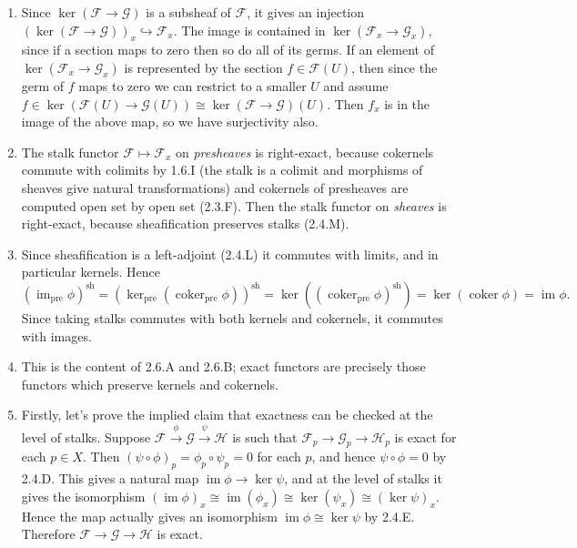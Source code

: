 \documentclass{report}
\newcommand{\pre}{{\mathrm{pre}}} %
\newcommand{\sh}{{\mathrm{sh}}} %
\newcommand{\scrF}{\mathscr{F}}
\newcommand{\scrG}{\mathscr{G}}
\newcommand{\scrH}{\mathscr{H}}
\DeclareMathOperator{\im}{im}
\DeclareMathOperator{\coker}{coker}
\begin{document}
\begin{enumerate}[label=\textbf{2.6.\Alph*.}]
	\item Since $\ker(\scrF\to\scrG)$ is a subsheaf of $\scrF$, it gives an injection
	      $(\ker(\scrF\to\scrG))_x\hookrightarrow\scrF_x$. The image is contained in
	      $\ker(\scrF_x\to\scrG_x)$, since if a section maps to zero then so do all of
	      its germs. If an element of $\ker(\scrF_x\to\scrG_x)$ is represented by the
	      section $f\in\scrF(U)$, then since the germ of $f$ maps to zero we can
	      restrict to a smaller $U$ and assume
	      $f\in\ker(\scrF(U)\to\scrG(U))\cong\ker(\scrF\to\scrG)(U)$. Then $f_x$ is in the
	      image of the above map, so we have surjectivity also.

	\item The stalk functor $\scrF\mapsto\scrF_x$ on \emph{presheaves} is right-exact,
	      because cokernels commute with colimits by 1.6.I (the stalk is a colimit
	      and morphisms of sheaves give natural transformations) and cokernels of
	      presheaves are computed open set by open set (2.3.F). Then the stalk
	      functor on \emph{sheaves} is right-exact, because sheafification
	      preserves stalks (2.4.M).

	\item Since sheafification is a left-adjoint (2.4.L) it commutes with
	      limits, and in particular kernels. Hence
	      \begin{equation*}
		      (\im_\pre\phi)^\sh
		      = (\ker_\pre(\coker_\pre\phi))^\sh
		      = \ker((\coker_\pre\phi)^\sh)
		      = \ker(\coker\phi)
		      = \im\phi.
	      \end{equation*}
	      Since taking stalks commutes with both kernels and cokernels, it commutes
	      with images.

	\item This is the content of 2.6.A and 2.6.B; exact functors are precisely
	      those functors which preserve kernels and cokernels.

	\item Firstly, let's prove the implied claim that exactness can be checked
	      at the level of stalks. Suppose $\scrF\xrightarrow\phi\scrG\xrightarrow\psi\scrH$
	      is such that $\scrF_p\to\scrG_p\to\scrH_p$ is exact for each $p\in X$. Then
	      $(\psi\circ\phi)_p=\phi_p\circ\psi_p=0$ for each $p$, and hence
	      $\psi\circ\phi=0$ by 2.4.D. This gives a natural map
	      $\im\phi\to\ker\psi$, and at the level of stalks it gives the
	      isomorphism $(\im\phi)_x\cong\im(\phi_x)\cong\ker(\psi_x)\cong(\ker\psi)_x$.
	      Hence the map actually gives an isomorphism $\im\phi\cong\ker\psi$ by
	      2.4.E. Therefore $\scrF\to\scrG\to\scrH$ is exact.


\end{enumerate}
\end{document}
